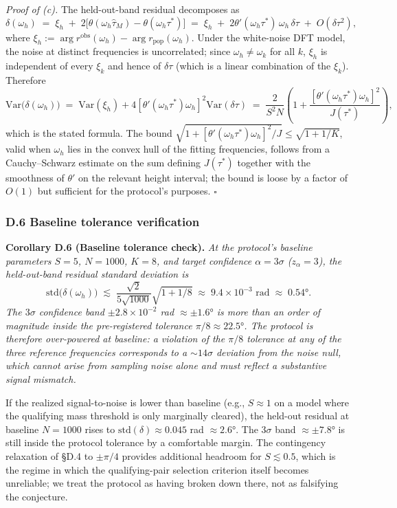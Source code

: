 \documentclass[
  letterpaper,
  11pt]{article}
\theoremstyle{plain}
\theoremstyle{definition}
\theoremstyle{remark}
\begin{document}
\emph{Proof of (c).} The held-out-band residual decomposes as
\[\delta(\omega_h) \;=\; \xi_h \;+\; 2\bigl[\theta(\omega_h\hat\tau_M) - \theta(\omega_h\tau^*)\bigr] \;=\; \xi_h \;+\; 2\theta'(\omega_h\tau^*)\,\omega_h\,\delta\tau \;+\; O(\delta\tau^2),\]
where \(\xi_h := \arg r^{\text{obs}}(\omega_h) - \arg r_{\text{pop}}(\omega_h)\). Under the white-noise DFT model, the noise at distinct frequencies is uncorrelated; since \(\omega_h \neq \omega_k\) for all \(k\), \(\xi_h\) is independent of every \(\xi_k\) and hence of \(\delta\tau\) (which is a linear combination of the \(\xi_k\)). Therefore
\[\mathrm{Var}\bigl(\delta(\omega_h)\bigr) \;=\; \mathrm{Var}(\xi_h) + 4[\theta'(\omega_h\tau^*)\omega_h]^2 \mathrm{Var}(\delta\tau) \;=\; \frac{2}{S^2 N}\left(1 + \frac{[\theta'(\omega_h\tau^*)\omega_h]^2}{J(\tau^*)}\right),\]
which is the stated formula. The bound \(\sqrt{1 + [\theta'(\omega_h\tau^*)\omega_h]^2/J} \leq \sqrt{1 + 1/K}\), valid when \(\omega_h\) lies in the convex hull of the fitting frequencies, follows from a Cauchy--Schwarz estimate on the sum defining \(J(\tau^*)\) together with the smoothness of \(\theta'\) on the relevant height interval; the bound is loose by a factor of \(O(1)\) but sufficient for the protocol's purposes. \(\square\)

\subsubsection{D.6 Baseline tolerance verification}\label{d.6-baseline-tolerance-verification}

\textbf{Corollary D.6 (Baseline tolerance check).} \emph{At the protocol's baseline parameters \(S = 5\), \(N = 1000\), \(K = 8\), and target confidence \(\alpha = 3\sigma\) (\(z_\alpha = 3\)), the held-out-band residual standard deviation is}
\[\mathrm{std}\bigl(\delta(\omega_h)\bigr) \;\lesssim\; \frac{\sqrt{2}}{5\sqrt{1000}}\sqrt{1 + 1/8} \;\approx\; 9.4 \times 10^{-3} \text{ rad} \;\approx\; 0.54°.\]
\emph{The \(3\sigma\) confidence band \(\pm 2.8 \times 10^{-2}\) rad \(\approx \pm 1.6°\) is more than an order of magnitude inside the pre-registered tolerance \(\pi/8 \approx 22.5°\). The protocol is therefore over-powered at baseline: a violation of the \(\pi/8\) tolerance at any of the three reference frequencies corresponds to a \(\sim 14\sigma\) deviation from the noise null, which cannot arise from sampling noise alone and must reflect a substantive signal mismatch.}

If the realized signal-to-noise is lower than baseline (e.g., \(S \approx 1\) on a model where the qualifying mass threshold is only marginally cleared), the held-out residual at baseline \(N = 1000\) rises to \(\mathrm{std}(\delta) \approx 0.045\) rad \(\approx 2.6°\). The \(3\sigma\) band \(\approx \pm 7.8°\) is still inside the protocol tolerance by a comfortable margin. The contingency relaxation of §D.4 to \(\pm\pi/4\) provides additional headroom for \(S \lesssim 0.5\), which is the regime in which the qualifying-pair selection criterion itself becomes unreliable; we treat the protocol as having broken down there, not as falsifying the conjecture.
\end{document}
